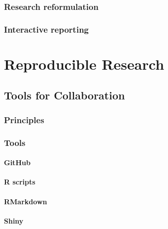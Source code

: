 \documentclass[
]{book}
\begin{document}
\hypertarget{research-reformulation}{%
\section{Research reformulation}\label{research-reformulation}}

\hypertarget{interactive-reporting}{%
\section{Interactive reporting}\label{interactive-reporting}}

\hypertarget{part-reproducible-research}{%
\part*{Reproducible Research}\label{part-reproducible-research}}

\hypertarget{tools_for_colab}{%
\chapter{Tools for Collaboration}\label{tools_for_colab}}

\hypertarget{principles-1}{%
\section{Principles}\label{principles-1}}

\hypertarget{tools}{%
\section{Tools}\label{tools}}

\hypertarget{github}{%
\subsection{GitHub}\label{github}}

\hypertarget{r-scripts}{%
\subsection{R scripts}\label{r-scripts}}

\hypertarget{rmarkdown}{%
\subsection{RMarkdown}\label{rmarkdown}}

\hypertarget{shiny}{%
\subsection{Shiny}\label{shiny}}
\end{document}

